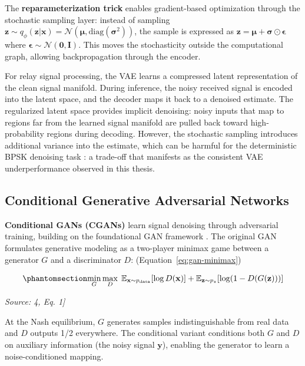 The \textbf{reparameterization trick} enables gradient-based optimization through the stochastic sampling layer: instead of sampling \(\mathbf{z} \sim q_\phi(\mathbf{z} | \mathbf{x}) = \mathcal{N}(\boldsymbol{\mu}, \text{diag}(\boldsymbol{\sigma}^2))\), the sample is expressed as \(\mathbf{z} = \boldsymbol{\mu} + \boldsymbol{\sigma} \odot \boldsymbol{\epsilon}\) where \(\boldsymbol{\epsilon} \sim \mathcal{N}(\mathbf{0}, \mathbf{I})\). This moves the stochasticity outside the computational graph, allowing backpropagation through the encoder.

For relay signal processing, the VAE learns a compressed latent representation of the clean signal manifold. During inference, the noisy received signal is encoded into the latent space, and the decoder maps it back to a denoised estimate. The regularized latent space provides implicit denoising: noisy inputs that map to regions far from the learned signal manifold are pulled back toward high-probability regions during decoding. However, the stochastic sampling introduces additional variance into the estimate, which can be harmful for the deterministic BPSK denoising task : a trade-off that manifests as the consistent VAE underperformance observed in this thesis.

\subsection{Conditional Generative Adversarial Networks}\label{sec:conditional-generative-adversarial-networks}

\textbf{Conditional GANs (CGANs)} \cite{MirzaOsindero2014cGAN} learn signal denoising through adversarial training, building on the foundational GAN framework \cite{Goodfellow2014GAN}. The original GAN formulates generative modeling as a two-player minimax game between a generator \(G\) and a discriminator \(D\): (Equation~\ref{eq:gan-minimax})

\begin{equation}\protect\phantomsection\label{eq:gan-minimax}{\min_G \max_D \; \mathbb{E}_{\mathbf{x} \sim p_{\text{data}}}[\log D(\mathbf{x})] + \mathbb{E}_{\mathbf{z} \sim p_z}[\log(1 - D(G(\mathbf{z})))]
}\end{equation} \par{\small\textit{Source: \cite{Laneman2004CooperativeDiversity}4, Eq. 1]}}

At the Nash equilibrium, \(G\) generates samples indistinguishable from real data and \(D\) outputs 1/2 everywhere. The conditional variant conditions both \(G\) and \(D\) on auxiliary information (the noisy signal \(\mathbf{y}\)), enabling the generator to learn a noise-conditioned mapping.


